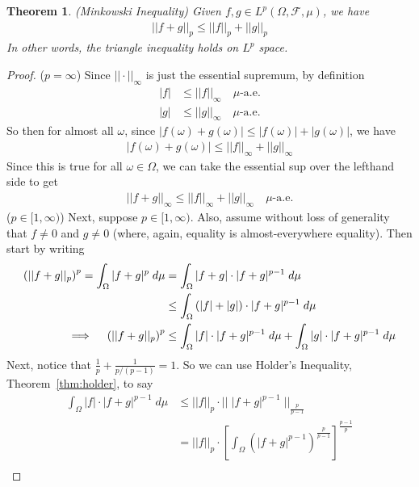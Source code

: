 \documentclass[12pt]{article}
\theoremstyle{plain}
\newtheorem{thm}{Theorem}[section]
\theoremstyle{definition}
\theoremstyle{remark}
\newcommand{\sF}{\mathscr{F}}
\begin{document}
\begin{thm}\emph{(Minkowski Inequality)}
\label{thm:minkowski}
Given $f,g \in L^p(\Omega,\sF,\mu)$, we have
\begin{align*}
  ||f+g||_p \leq ||f||_p + ||g||_p
\end{align*}
In other words, the triangle inequality holds on $L^p$ space.
\end{thm}
\begin{proof}
($p=\infty$)
Since $|| \cdot||_\infty$ is just the essential supremum, by definition
\begin{align*}
    |f|&\leq || f||_\infty
    \quad \text{$\mu$-a.e.}\\
    |g|&\leq || g||_\infty
    \quad \text{$\mu$-a.e.}
\end{align*}
So then for almost all $\omega$, since
$|f(\omega)+g(\omega)|\leq |f(\omega)|+|g(\omega)|$, we have
\begin{align*}
    |f(\omega)+g(\omega)|\leq || f||_\infty
    + || g||_\infty
\end{align*}
Since this is true for all $\omega\in\Omega$, we can take the essential
sup over the lefthand side to get
\begin{align*}
    || f+g||_\infty
    \leq || f||_\infty
    + || g||_\infty
    \quad \text{$\mu$-a.e.}
\end{align*}
($p\in[1,\infty)$)
Next, suppose $p\in[1,\infty)$. Also, assume without loss of
generality that $f\neq 0$ and $g\neq 0$ (where, again, equality is
almost-everywhere equality).
Then start by writing
\begin{align}
  \left(||f+g||_p\right)^p
  = \int_\Omega |f+g|^p \; d\mu
  &= \int_\Omega |f+g| \cdot |f+g|^{p-1}\; d\mu \notag \\
  &\leq
  \int_\Omega \left(|f|+|g| \right)\cdot |f+g|^{p-1}\; d\mu \notag\\
  \implies\quad
  \left(||f+g||_p\right)^p
  &\leq
  \int_\Omega |f|\cdot |f+g|^{p-1}\; d\mu
  +
  \int_\Omega |g| \cdot |f+g|^{p-1}\; d\mu
  \label{fplusg}
\end{align}
Next, notice that $\frac{1}{p} +\frac{1}{p/(p-1)}=1$. So we can use
Holder's Inequality, Theorem~\ref{thm:holder}, to say
\begin{align*}
  \int_\Omega |f|\cdot |f+g|^{p-1}\; d\mu
  &\leq
  ||f||_p \cdot
  \big|\big|\;|f+g|^{p-1}\;\big|\big|_{\frac{p}{p-1}} \\
  &=
  ||f||_p \cdot
  \left[
    \int_\Omega \left(|f+g|^{p-1}\right)^\frac{p}{p-1}
  \right]^\frac{p-1}{p} \\

\end{align*}
\end{proof}
\end{document}
